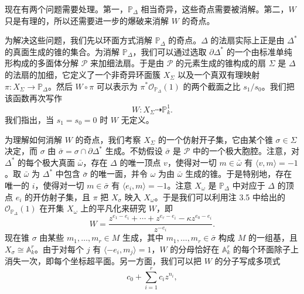 现在有两个问题需要处理。第一，$\mathbb{P}_{\Delta}$ 相当奇异，这些奇点需要被消解。第二，$W$ 只是有理的，所以还需要进一步的爆破来消解 $W$ 的奇点。

为解决这些问题，我们先以环面方式消解 $\mathbb{P}_{\Delta}$ 的奇点。$\Delta$ 的法扇实际上正是由 $\Delta^{*}$ 的真面生成的锥的集合。为消解 $\mathbb{P}_{\Delta}$，我们可以通过选取 $\partial\Delta^{*}$ 的一个由标准单纯形构成的多面体分解 $\mathcal{P}$ 来加细法扇。于是由 $\mathcal{P}$ 的元素生成的锥构成的扇 $\Sigma$ 是 $\Delta$ 的法扇的加细，它定义了一个非奇异环面簇 $X_{\Sigma}$ 以及一个真双有理映射 $\pi:X_{\Sigma}\to\mathbb{P}_{\Delta}$。然后 $W\circ\pi$ 可以表示为 $\pi^{*}\mathcal{O}_{\mathbb{P}_{\Delta}}(1)$ 的两个截面之比 $s_1/s_0$。我们把该函数再次写作
\[
  W:X_{\Sigma}\dashrightarrow\mathbb{P}^1_k.
\]
我们指出，当 $s_1=s_0=0$ 时 $W$ 无定义。


为理解如何消解 $W$ 的奇点，我们考察 $X_{\Sigma}$ 的一个仿射开子集，它由某个锥 $\sigma\in\Sigma$ 决定，而 $\sigma$ 由 $\bar\sigma=\sigma\cap\partial\Delta^{*}$ 生成。不妨假设 $\bar\sigma$ 是 $\mathcal{P}$ 中的一个极大胞腔。注意，对 $\Delta^{*}$ 的每个极大真面 $\bar\omega$，存在 $\Delta$ 的唯一顶点 $v$，使得对一切 $m\in\bar\omega$ 有 $\langle v,m\rangle=-1$。取 $\bar\omega$ 为 $\Delta^{*}$ 中包含 $\bar\sigma$ 的唯一面，并令 $\omega$ 为由 $\bar\omega$ 生成的锥。于是特别地，存在唯一的 $i$，使得对一切 $m\in\bar\sigma$ 有 $\langle e_i,m\rangle=-1$。注意 $X_{\omega}$ 是 $\mathbb{P}_{\Delta}$ 中对应于 $\Delta$ 的顶点 $e_i$ 的开仿射子集，且 $\pi$ 把 $X_{\sigma}$ 映入 $X_{\omega}$。于是我们可以利用注 3.5 中给出的 $\mathcal{O}_{\mathbb{P}_{\Delta}}(1)$ 在开集 $X_{\omega}$ 上的平凡化来研究 $W$，即
\[
  W=\frac{z^{e_1-e_i}+\cdots+z^{e_r-e_i}-\kappa z^{e_0-e_i}}{z^{-e_i}}.
\]
现在锥 $\sigma$ 由某些 $m_1,\dots,m_r\in M$ 生成，其中 $m_1,\dots,m_r\in\bar\sigma$ 构成 $M$ 的一组基，且 $X_{\sigma}\cong\mathbb{A}^r_k$。由于对每个 $j$ 有 $\langle-e_i,m_j\rangle=1$，$W$ 的分母恰好在 $\mathbb{A}^r_k$ 的每个环面除子上消失一次，即每个坐标超平面。另一方面，我们可以把 $W$ 的分子写成多项式
\[
  c_0+\sum_{i=1}^{r}c_iz^{n_i},
\]

